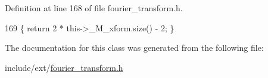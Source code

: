 Definition at line 168 of file fourier\+\_\+transform.\+h.


\begin{DoxyCode}
169       \{ \textcolor{keywordflow}{return} 2 * this->\_M\_xform.size() - 2; \}
\end{DoxyCode}


The documentation for this class was generated from the following file\+:\begin{DoxyCompactItemize}
\item 
include/ext/\hyperlink{fourier__transform_8h}{fourier\+\_\+transform.\+h}\end{DoxyCompactItemize}
